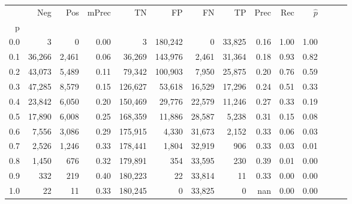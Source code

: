 \begin{tabular}{rrrrrrrrrrrrrr}
\toprule
{} &     Neg &    Pos & mPrec &       TN &       FP &      FN &      TP &  Prec &   Rec & $\hat{p}$ \\
p   &         &        &       &          &          &         &         &       &       &           \\
\midrule
0.0 &       3 &      0 &  0.00 &        3 &  180,242 &       0 &  33,825 &  0.16 &  1.00 &      1.00 \\
0.1 &  36,266 &  2,461 &  0.06 &   36,269 &  143,976 &   2,461 &  31,364 &  0.18 &  0.93 &      0.82 \\
0.2 &  43,073 &  5,489 &  0.11 &   79,342 &  100,903 &   7,950 &  25,875 &  0.20 &  0.76 &      0.59 \\
0.3 &  47,285 &  8,579 &  0.15 &  126,627 &   53,618 &  16,529 &  17,296 &  0.24 &  0.51 &      0.33 \\
0.4 &  23,842 &  6,050 &  0.20 &  150,469 &   29,776 &  22,579 &  11,246 &  0.27 &  0.33 &      0.19 \\
0.5 &  17,890 &  6,008 &  0.25 &  168,359 &   11,886 &  28,587 &   5,238 &  0.31 &  0.15 &      0.08 \\
0.6 &   7,556 &  3,086 &  0.29 &  175,915 &    4,330 &  31,673 &   2,152 &  0.33 &  0.06 &      0.03 \\
0.7 &   2,526 &  1,246 &  0.33 &  178,441 &    1,804 &  32,919 &     906 &  0.33 &  0.03 &      0.01 \\
0.8 &   1,450 &    676 &  0.32 &  179,891 &      354 &  33,595 &     230 &  0.39 &  0.01 &      0.00 \\
0.9 &     332 &    219 &  0.40 &  180,223 &       22 &  33,814 &      11 &  0.33 &  0.00 &      0.00 \\
1.0 &      22 &     11 &  0.33 &  180,245 &        0 &  33,825 &       0 &   nan &  0.00 &      0.00 \\
\bottomrule
\end{tabular}

